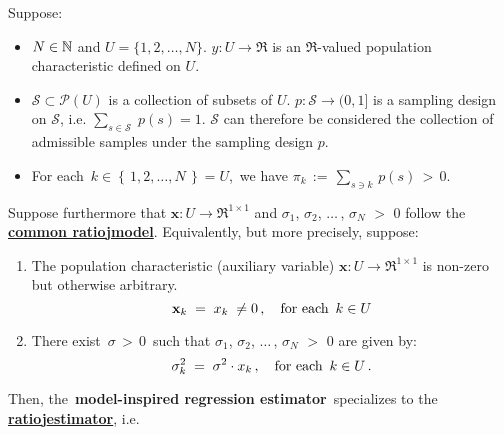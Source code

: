 \begin{proposition}
\mbox{}
\vskip 0.05cm
\noindent
Suppose:
\begin{itemize}
\item
	$N \in \mathbb{N}$ and $U = \{1,2,\ldots,N\}$.
	\vskip 0.05cm
	$y : U \longrightarrow \Re$ is an $\Re$-valued population characteristic defined on $U$.
\item
	$\mathcal{S} \subset \mathcal{P}(U)$ is a collection of subsets of $U$.
	$p : \mathcal{S} \longrightarrow (0,1]$ is a sampling design on $\mathcal{S}$,
	i.e. $\underset{s\in\mathcal{S}}{\sum}\;p(s) = 1$.
	\vskip 0.05cm
	$\mathcal{S}$ can therefore be considered the collection of admissible samples under the sampling design $p$.
\item
	For each \,$k \in \left\{\,1,2,\ldots,N\,\right\} = U$,\, we have
	$\pi_{k} \,:=\, \underset{s \ni k}{\sum}\,p(s) \,>\, 0$.
\end{itemize}
Suppose furthermore that
$\mathbf{x} : U \longrightarrow \Re^{1 \times 1}$ and
$\sigma_{1}$, $\sigma_{2}$, $\ldots$\,, $\sigma_{N}$ $>$ $0$
follow the \,\underline{\textbf{{\color{red}common ratio}{\color{white}j}model}}.
\renewcommand{\theenumi}{\alph{enumi}}
\renewcommand{\labelenumi}{\textnormal{(\theenumi)}$\;\;$}
\vskip 0.1cm
\noindent
Equivalently, but more precisely, suppose:
\begin{enumerate}
\item \vskip -0.10cm
	The population characteristic (auxiliary variable)
	$\mathbf{x} : U \longrightarrow \Re^{1 \times 1}$ is non-zero but otherwise arbitrary.
	\begin{equation*}
	\mathbf{x}_{k}
		\; = \; x_{k}
		\; \neq 0\,,
	\quad\textnormal{for each \,$k \in U$}
	\end{equation*}
\item
	There exist \,$\sigma \,>\, 0$\, such that
	$\sigma_{1}$, $\sigma_{2}$, $\ldots$\,, $\sigma_{N}$ $>$ $0$ are given by:
	\begin{equation*}
	\sigma_{k}^{2} \; = \; \sigma^{2} \cdot x_{k}\,,
	\quad\textnormal{for each \,$k \in U$}\,.
	\end{equation*}
\end{enumerate}
\renewcommand{\theenumi}{\roman{enumi}}
\renewcommand{\labelenumi}{\textnormal{(\theenumi)}$\;\;$}
Then, the \,\textbf{model-inspired regression estimator}\,
specializes to the \,\underline{\textbf{{\color{red}ratio}{\color{white}j}estimator}}, i.e.

\end{proposition}
